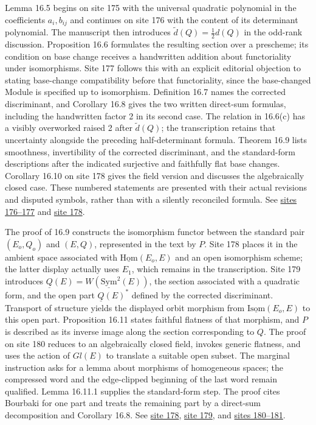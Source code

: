 \documentclass[10pt,a4paper]{article}
\begin{document}
Lemma 16.5 begins on site 175 with the universal quadratic polynomial in the coefficients \(a_i,b_{ij}\) and continues on site 176 with the content of its determinant polynomial. The manuscript then introduces \(\widetilde d(Q)=\tfrac12d(Q)\) in the odd-rank discussion. Proposition 16.6 formulates the resulting section over a prescheme; its condition on base change receives a handwritten addition about functoriality under isomorphisms. Site 177 follows this with an explicit editorial objection to stating base-change compatibility before that functoriality, since the base-changed Module is specified up to isomorphism. Definition 16.7 names the corrected discriminant, and Corollary 16.8 gives the two written direct-sum formulas, including the handwritten factor 2 in its second case. The relation in 16.6(c) has a visibly overworked raised 2 after \(\widetilde d(Q)\); the transcription retains that uncertainty alongside the preceding half-determinant formula. Theorem 16.9 lists smoothness, invertibility of the corrected discriminant, and the standard-form descriptions after the indicated surjective and faithfully flat base changes. Corollary 16.10 on site 178 gives the field version and discusses the algebraically closed case. These numbered statements are presented with their actual revisions and disputed symbols, rather than with a silently reconciled formula. See \href{https://grothendieck.umontpellier.fr/web/viewer.html?file=../25.pdf#page=177}{sites 176--177} and \href{https://grothendieck.umontpellier.fr/web/viewer.html?file=../25.pdf#page=179}{site 178}.

The proof of 16.9 constructs the isomorphism functor between the standard pair \((E_o,Q_o)\) and \((E,Q)\), represented in the text by \(P\). Site 178 places it in the ambient space associated with \(\underline{\mathrm{Hom}}(E_o,E)\) and an open isomorphism scheme; the latter display actually uses \(E_1\), which remains in the transcription. Site 179 introduces \(\underline Q(E)=W(\underline{\mathrm{Sym}}^2(E))\), the section associated with a quadratic form, and the open part \(\underline Q(E)^*\) defined by the corrected discriminant. Transport of structure yields the displayed orbit morphism from \(\underline{\mathrm{Isom}}(E_o,E)\) to this open part. Proposition 16.11 states faithful flatness of that morphism, and \(P\) is described as its inverse image along the section corresponding to \(Q\). The proof on site 180 reduces to an algebraically closed field, invokes generic flatness, and uses the action of \(Gl(E)\) to translate a suitable open subset. The marginal instruction asks for a lemma about morphisms of homogeneous spaces; the compressed word and the edge-clipped beginning of the last word remain qualified. Lemma 16.11.1 supplies the standard-form step. The proof cites Bourbaki for one part and treats the remaining part by a direct-sum decomposition and Corollary 16.8. See \href{https://grothendieck.umontpellier.fr/web/viewer.html?file=../25.pdf#page=179}{site 178}, \href{https://grothendieck.umontpellier.fr/web/viewer.html?file=../25.pdf#page=180}{site 179}, and \href{https://grothendieck.umontpellier.fr/web/viewer.html?file=../25.pdf#page=181}{sites 180--181}.
\end{document}
